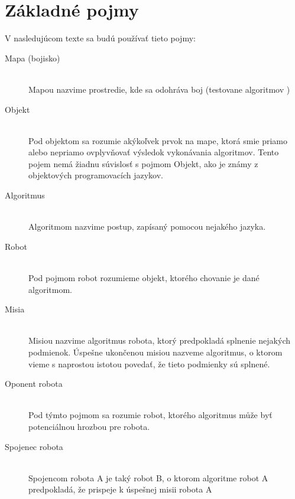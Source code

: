 \section{ Základné pojmy }
V nasledujúcom texte sa budú používať tieto pojmy:
\begin{description}
\item[Mapa (bojisko)]\hfill \\
	Mapou nazvime prostredie, kde sa odohráva boj (testovane algoritmov )
\item[Objekt]\hfill \\
	Pod objektom sa rozumie akýkoľvek prvok na mape, ktorá smie priamo alebo nepriamo ovplyvňovať výsledok vykonávania algoritmov. Tento pojem nemá žiadnu súvislosť s pojmom Objekt, ako je známy z objektových programovacích jazykov.
\item[Algoritmus]\hfill \\
	Algoritmom nazvime postup, zapísaný pomocou nejakého jazyka. 
\item[Robot]\hfill \\
	Pod pojmom robot rozumieme objekt, ktorého chovanie je dané algoritmom.
\item[Misia]\hfill \\
	Misiou nazvime algoritmus robota, ktorý predpokladá splnenie nejakých podmienok. Úspešne ukončenou misiou nazveme algoritmus, o ktorom vieme s naprostou istotou povedať, že tieto podmienky sú splnené.
\item[Oponent robota]\hfill \\
	Pod týmto pojmom sa rozumie robot, ktorého algoritmus může byť potenciálnou hrozbou pre robota.
\item[Spojenec robota] \hfill \\
	Spojencom robota A je taký robot B, o ktorom algoritme robot A predpokladá, že prispeje k úspešnej misii robota A %
\end{description}

